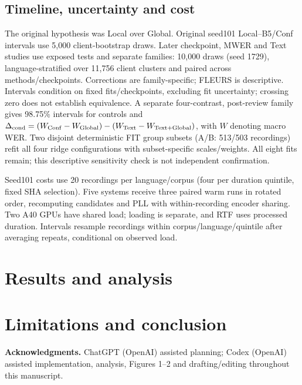 \documentclass{article}
\begin{document}
\subsection{Timeline, uncertainty and cost}\label{sec:timeline}
The original hypothesis was Local over Global. Original seed101 Local--B5/Conf intervals use 5{,}000 client-bootstrap draws. Later checkpoint, MWER and Text studies use exposed tests and separate families: 10{,}000 draws (seed 1729), language-stratified over 11{,}756 client clusters and paired across methods/checkpoints. Corrections are family-specific; FLEURS is descriptive. Intervals condition on fixed fits/checkpoints, excluding fit uncertainty; crossing zero does not establish equivalence. A separate four-contrast, post-review family gives 98.75\% intervals for controls and $\Delta_{\rm cond}=(W_{\rm Conf}-W_{\rm Global})\allowbreak-(W_{\rm Text}-W_{\rm Text+Global})$, with $W$ denoting macro WER. Two disjoint deterministic FIT group subsets (A/B: 513/503 recordings) refit all four ridge configurations with subset-specific scales/weights. All eight fits remain; this descriptive sensitivity check is not independent confirmation.

Seed101 costs use 20 recordings per language/corpus (four per duration quintile, fixed SHA selection). Five systems receive three paired warm runs in rotated order, recomputing candidates and PLL with within-recording encoder sharing. Two A40 GPUs have shared load; loading is separate, and RTF uses processed duration. Intervals resample recordings within corpus/language/quintile after averaging repeats, conditional on observed load.

\section{Results and analysis}
\par
\par
\par
\par

\section{Limitations and conclusion}
\par
\noindent\textbf{Acknowledgments.} ChatGPT (OpenAI) assisted planning; Codex (OpenAI) assisted implementation, analysis, Figures 1--2 and drafting/editing throughout this manuscript.
\clearpage
\balance
\end{document}
